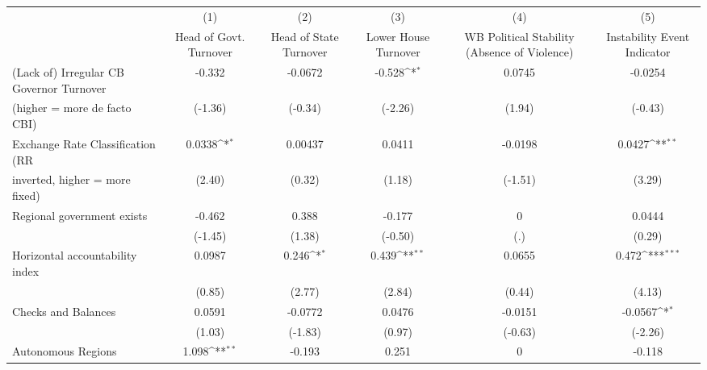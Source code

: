 {
\def\sym#1{\ifmmode^{#1}\else\(^{#1}\)\fi}
\begin{tabular}{l*{5}{c}}
\toprule
                                        &\multicolumn{1}{c}{(1)}&\multicolumn{1}{c}{(2)}&\multicolumn{1}{c}{(3)}&\multicolumn{1}{c}{(4)}&\multicolumn{1}{c}{(5)}\\
                                        &\multicolumn{1}{c}{Head of Govt. Turnover}&\multicolumn{1}{c}{Head of State Turnover}&\multicolumn{1}{c}{Lower House Turnover}&\multicolumn{1}{c}{WB Political Stability (Absence of Violence)}&\multicolumn{1}{c}{Instability Event Indicator}\\
\midrule
(Lack of) Irregular CB Governor Turnover&    -0.332         &   -0.0672         &    -0.528\sym{*}  &    0.0745         &   -0.0254         \\
(higher = more de facto CBI)            &   (-1.36)         &   (-0.34)         &   (-2.26)         &    (1.94)         &   (-0.43)         \\
\addlinespace
Exchange Rate Classification (RR        &    0.0338\sym{*}  &   0.00437         &    0.0411         &   -0.0198         &    0.0427\sym{**} \\
inverted, higher = more fixed)          &    (2.40)         &    (0.32)         &    (1.18)         &   (-1.51)         &    (3.29)         \\
\addlinespace
Regional government exists              &    -0.462         &     0.388         &    -0.177         &         0         &    0.0444         \\
                                        &   (-1.45)         &    (1.38)         &   (-0.50)         &       (.)         &    (0.29)         \\
\addlinespace
Horizontal accountability index         &    0.0987         &     0.246\sym{*}  &     0.439\sym{**} &    0.0655         &     0.472\sym{***}\\
                                        &    (0.85)         &    (2.77)         &    (2.84)         &    (0.44)         &    (4.13)         \\
\addlinespace
Checks and Balances                     &    0.0591         &   -0.0772         &    0.0476         &   -0.0151         &   -0.0567\sym{*}  \\
                                        &    (1.03)         &   (-1.83)         &    (0.97)         &   (-0.63)         &   (-2.26)         \\
\addlinespace
Autonomous Regions                      &     1.098\sym{**} &    -0.193         &     0.251         &         0         &    -0.118         \\

\end{tabular}}
